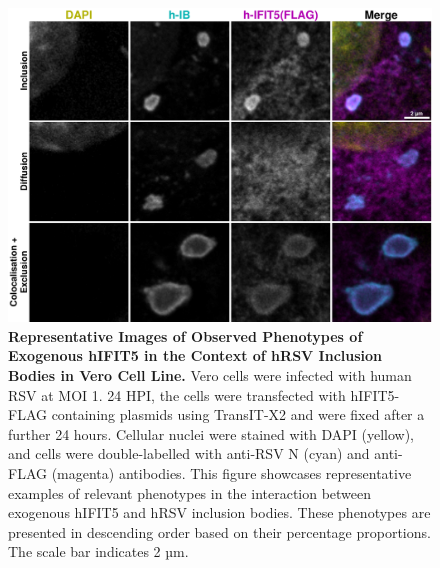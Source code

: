 \begin{figure}
    \centering
    \includegraphics[width=1\linewidth]{09. Chapter 4/Figs/02. Overexpression/04. IFIT5/03. i5-hrsv.pdf}
    \caption[Representative Images of Observed Phenotypes of Exogenous hIFIT5 in the Context of hRSV Inclusion Bodies in Vero Cell Line.]{\textbf{Representative Images of Observed Phenotypes of Exogenous hIFIT5 in the Context of hRSV Inclusion Bodies in Vero Cell Line.} Vero cells were infected with human RSV at MOI 1. 24 HPI, the cells were transfected with hIFIT5-FLAG containing plasmids using TransIT-X2 and were fixed after a further 24 hours. Cellular nuclei were stained with DAPI (yellow), and cells were double-labelled with anti-RSV N (cyan) and anti-FLAG (magenta) antibodies. This figure showcases representative examples of relevant phenotypes in the interaction between exogenous hIFIT5 and hRSV inclusion bodies. These phenotypes are presented in descending order based on their percentage proportions. The scale bar indicates 2 µm.}
    \label{fig:Representative Images of Observed Phenotypes of Exogenous hIFIT5 in the Context of hRSV Inclusion Bodies in VERO Cell Line}
\end{figure}

